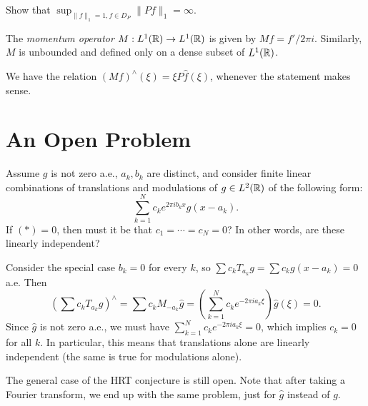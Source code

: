 \begin{exercise}
  Show that
  $\sup_{\|f\|_1 = 1, f \in D_P} \|P f\|_1 = \infty$.
\end{exercise}

\begin{definition}
  The \emph{momentum operator}
  $M : L^1(\mathbb{R}) \to L^1(\mathbb{R})$ is given by
  $M f = f' / 2\pi i$. Similarly,
  $M$ is unbounded and defined only on a
  dense subset of $L^1(\mathbb{R})$.
\end{definition}

\begin{remark}
  We have the relation
  $(Mf)^\wedge(\xi) = \xi P \widehat{f}(\xi)$,
  whenever the statement makes sense.
\end{remark}

\section{An Open Problem}

\begin{conjecture}
  Assume $g$ is not zero a.e.,
  $a_k, b_k$ are distinct, and
  consider finite linear combinations of
  translations and modulations
  of $g \in L^2(\mathbb{R})$ of the following form:
  \[
    \sum_{k = 1}^N c_k e^{2\pi i b_k x} g(x - a_k). \tag{$*$}
  \]
  If $(*) = 0$, then must it be that
  $c_1 = \cdots = c_N = 0$? In other
  words, are these linearly
  independent?
\end{conjecture}

\begin{remark}
  Consider the special case $b_k = 0$
  for every $k$, so
  $\sum c_k T_{a_k} g = \sum c_k g(x - a_k) = 0$ a.e. Then
  \[
    \left(\sum c_k T_{a_k} g\right)^\wedge
    = \sum c_k M_{-a_k} \widehat{g}
    = \left(\sum_{k = 1}^N c_k e^{-2\pi i a_k \xi}\right)
    \widehat{g}(\xi) = 0.
  \]
  Since $\widehat{g}$ is not zero a.e., we
  must have
  $\sum_{k = 1}^N c_k e^{-2\pi i a_k \xi} = 0$,
  which implies $c_k = 0$ for all $k$.
  In particular, this means that
  translations alone are linearly independent
  (the same is true for modulations alone).
\end{remark}

\begin{remark}
  The general case of the HRT conjecture
  is still open. Note that after taking a
  Fourier transform, we end up with
  the same problem, just for $\widehat{g}$
  instead of $g$.
\end{remark}

